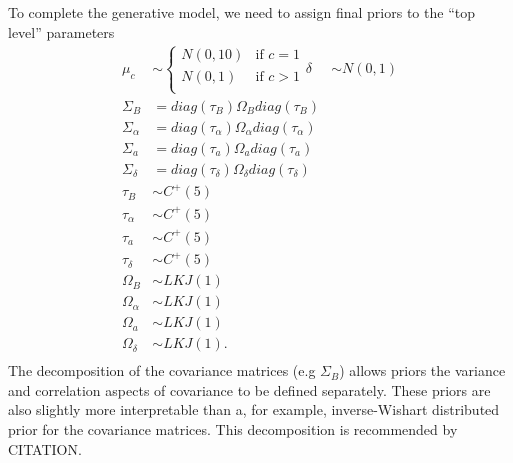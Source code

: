 \documentclass[12pt,letterpaper]{article}
\begin{document}
To complete the generative model, we need to assign final priors to the ``top level'' parameters
\begin{equation}
  \begin{aligned}
    \mu_{c} &\sim 
      \begin{cases}
        N(0, 10) & \text{if } c = 1 \\
        N(0, 1) & \text{if } c > 1 \\
      \end{cases}
    \delta &\sim N(0, 1) \\
    \Sigma_{B} &= diag(\tau_{B}) \Omega_{B} diag(\tau_{B}) \\
    \Sigma_{\alpha} &= diag(\tau_{\alpha}) \Omega_{\alpha} diag(\tau_{\alpha}) \\
    \Sigma_{a} &= diag(\tau_{a}) \Omega_{a} diag(\tau_{a}) \\
    \Sigma_{\delta} &= diag(\tau_{\delta}) \Omega_{\delta} diag(\tau_{\delta}) \\
    \tau_{B} &\sim C^{+}(5) \\
    \tau_{\alpha} &\sim C^{+}(5) \\
    \tau_{a} &\sim C^{+}(5) \\
    \tau_{\delta} &\sim C^{+}(5) \\
    \Omega_{B} &\sim LKJ(1) \\
    \Omega_{\alpha} &\sim LKJ(1) \\
    \Omega_{a} &\sim LKJ(1) \\
    \Omega_{\delta} &\sim LKJ(1). \\
  \end{aligned}
  \label{eq:priors}
\end{equation}
The decomposition of the covariance matrices (e.g \(\Sigma_{B}\)) allows priors the variance and correlation aspects of covariance to be defined separately. These priors are also slightly more interpretable than a, for example, inverse-Wishart distributed prior for the covariance matrices. This decomposition is recommended by CITATION.
\end{document}
